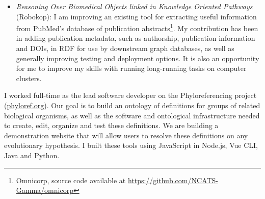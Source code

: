 \begin{itemize}
\begin{products}


\end{products}

\item \textit{Reasoning Over Biomedical Objects linked in Knowledge Oriented Pathways} (Robokop): I am improving an existing tool for extracting useful information from PubMed's database of publication abstracts\footnote{Omnicorp, source code available at \url{https://github.com/NCATS-Gamma/omnicorp}}. My contribution has been in adding publication metadata, such as authorship, publication information and DOIs, in RDF for use by downstream graph databases, as well as generally improving testing and deployment options. It is also an opportunity for me to improve my skills with running long-running tasks on computer clusters.


\begin{products}


\end{products}

\end{itemize}


I worked full-time as the lead software developer on the Phyloreferencing project (\href{http://phyloref.org}{phyloref.org}). Our goal is to build an ontology of definitions for groups of related biological organisms, as well as the software and ontological infrastructure needed to create, edit, organize and test these definitions. We are building a demonstration website that will allow users to resolve these definitions on any evolutionary hypothesis. I built these tools using JavaScript in Node.js, Vue CLI, Java and Python.


